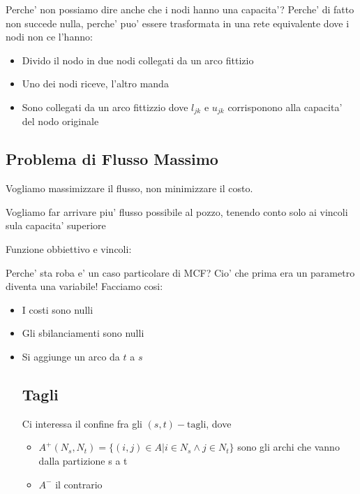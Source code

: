 Perche' non possiamo dire anche che i nodi hanno una capacita'? Perche' di fatto non succede nulla, perche' puo' essere trasformata in una rete equivalente dove i nodi non ce l'hanno:
\begin{itemize}
\item Divido il nodo in due nodi collegati da un arco fittizio
\item Uno dei nodi riceve, l'altro manda
\item Sono collegati da un arco fittizzio dove $ l_{jk} $ e $ u_{jk} $ corrisponono alla capacita' del nodo originale
\end{itemize}

\subsection{Problema di Flusso Massimo}
Vogliamo massimizzare il flusso, non minimizzare il costo.

Vogliamo far arrivare piu' flusso possibile al pozzo, tenendo conto solo ai vincoli sula capacita' superiore

Funzione obbiettivo e vincoli:

Perche' sta roba e' un caso particolare di MCF? Cio' che prima era un parametro diventa una variabile! Facciamo cosi:
\begin{itemize}
\item I costi sono nulli
\item Gli sbilanciamenti sono nulli
\item Si aggiunge un arco da $ t $ a $ s $ 

\subsection{Tagli}

    Ci interessa il confine fra gli $ (s,t)-\text{tagli} $, dove
    \begin{itemize}
      \item $ A^+(N_s, N_t) = \{(i,j) \in A| i \in N_s \land j \in N_t\} $ sono gli archi che vanno dalla partizione s a t
        \item $ A^- $ il contrario
    \end{itemize}

\end{itemize}

% 
